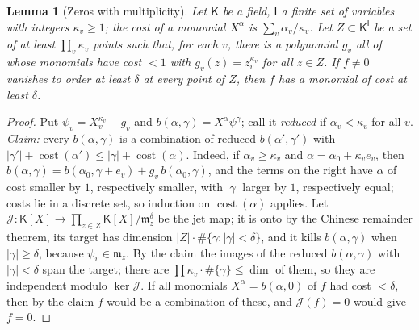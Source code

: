 \documentclass[10pt]{amsart}
\newtheorem{lemma}[theorem]{Lemma}
\theoremstyle{definition}
\theoremstyle{remark}
\begin{document}
\begin{lemma}[Zeros with multiplicity]\label{ph:null}
Let $\mathsf K$ be a field, $\mathsf I$ a finite set of variables with integers $\kappa_v\ge1$; the
\emph{cost} of a monomial $X^\alpha$ is $\sum_v\alpha_v/\kappa_v$. Let $Z\subset\mathsf K^{\mathsf
I}$ be a set of at least $\prod_v\kappa_v$ points such that, for each $v$, there is a polynomial
$g_v$ all of whose monomials have cost $<1$ with $g_v(z)=z_v^{\kappa_v}$ for all $z\in Z$. If
$f\ne0$ vanishes to order at least $\delta$ at every point of $Z$, then $f$ has a monomial of cost
at least $\delta$.
\end{lemma}
\begin{proof}
Put $\psi_v=X_v^{\kappa_v}-g_v$ and $b(\alpha,\gamma)=X^\alpha\psi^\gamma$; call it \emph{reduced}
if $\alpha_v<\kappa_v$ for all $v$. \emph{Claim:} every $b(\alpha,\gamma)$ is a combination of
reduced $b(\alpha',\gamma')$ with $|\gamma'|+\operatorname{cost}(\alpha')\le|\gamma|+
\operatorname{cost}(\alpha)$. Indeed, if $\alpha_v\ge\kappa_v$ and $\alpha=\alpha_0+\kappa_ve_v$,
then $b(\alpha,\gamma)=b(\alpha_0,\gamma+e_v)+g_v\,b(\alpha_0,\gamma)$, and the terms on the right
have $\alpha$ of cost smaller by $1$, respectively smaller, with $|\gamma|$ larger by $1$,
respectively equal; costs lie in a discrete set, so induction on $\operatorname{cost}(\alpha)$
applies. Let $\mathcal J\colon\mathsf K[X]\to\prod_{z\in Z}\mathsf K[X]/\mathfrak m_z^\delta$ be
the jet map; it is onto by the Chinese remainder theorem, its target has dimension
$|Z|\cdot\#\{\gamma:|\gamma|<\delta\}$, and it kills $b(\alpha,\gamma)$ when $|\gamma|\ge\delta$,
because $\psi_v\in\mathfrak m_z$. By the claim the images of the reduced $b(\alpha,\gamma)$ with
$|\gamma|<\delta$ span the target; there are $\prod\kappa_v\cdot\#\{\gamma\}\le\dim$ of them, so
they are independent modulo $\ker\mathcal J$. If all monomials $X^\alpha=b(\alpha,0)$ of $f$ had
cost $<\delta$, then by the claim $f$ would be a combination of these, and $\mathcal J(f)=0$ would
give $f=0$.
\end{proof}
\end{document}
